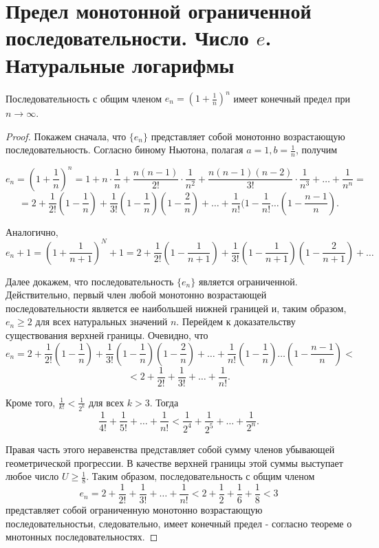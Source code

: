 \documentclass[14pt]{extreport}
\begin{document}
\section{Предел монотонной ограниченной последовательности. Число $e$. Натуральные логарифмы}
\begin{theorem}
Последовательность с общим членом $e_n=(1+\frac{1}{n})^n$ имеет конечный предел при $n\rightarrow\infty$.
\end{theorem}
\begin{proof}

Покажем сначала, что $\{e_n\}$ представляет собой монотонно возрастающую последовательность. Согласно биному Ньютона, полагая $a=1, b=\frac{1}{n}$, получим

$$e_n=(1+\frac{1}{n})^n=1+n\cdot\frac{1}{n}+\frac{n(n-1)}{2!}\cdot\frac{1}{n^2}+\frac{n(n-1)(n-2)}{3!}\cdot\frac{1}{n^3}+\dots+\frac{1}{n^n}=$$ $$=2+\frac{1}{2!}(1-\frac{1}{n})+\frac{1}{3!}(1-\frac{1}{n})(1-\frac{2}{n})+\dots+\frac{1}{n!}(1-\frac{1}{n!}\dots(1-\frac{n-1}{n}).$$

Аналогично,
$$e_n+1=(1+\frac{1}{n+1})^N+1=2+\frac{1}{2!}(1-\frac{1}{n+1})+\frac{1}{3!}(1-\frac{1}{n+1})(1-\frac{2}{n+1})+\dots$$

Далее докажем, что последовательность $\{e_n\}$ является ограниченной. Действительно, первый член любой монотонно возрастающей последовательности является ее наибольшей нижней границей и, таким образом, $e_n\geqslant 2$ для всех натуральных значений $n$. Перейдем к доказательству существования верхней границы. Очевидно, что
$$e_n=2+\frac{1}{2!}(1-\frac{1}{n})+\frac{1}{3!}(1-\frac{1}{n})(1-\frac{2}{n})+\dots+\frac{1}{n!}(1-\frac{1}{n})\dots(1-\frac{n-1}{n})<$$ $$<2+\frac{1}{2!}+\frac{1}{3!}+\dots+\frac{1}{n!}.$$

Кроме того, $\frac{1}{k!}<\frac{1}{2^k}$ для всех $k>3$. Тогда
$$\frac{1}{4!}+\frac{1}{5!}+\dots+\frac{1}{n!}<\frac{1}{2^4}+\frac{1}{2^5}+\dots+\frac{1}{2^n}.$$

Правая часть этого неравенства представляет собой сумму членов убывающей геометрической прогрессии. В качестве верхней границы этой суммы выступает любое число $U\geqslant\frac{1}{8}.$ Таким образом, последовательность с общим членом
$$e_n=2+\frac{1}{2!}+\frac{1}{3!}+\dots+\frac{1}{n!}<2+\frac{1}{2}+\frac{1}{6}+\frac{1}{8}<3$$
представляет собой ограниченную монотонно возрастающую последовательностьи, следовательно, имеет конечный предел - согласно теореме о мнотонных последовательностях.

\end{proof}
\end{document}
